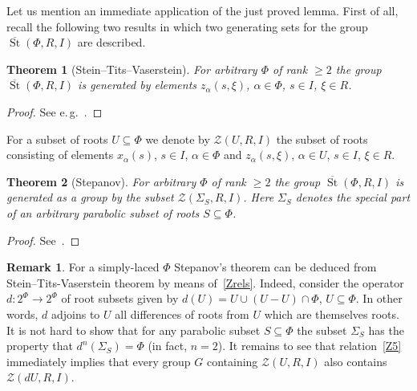 \documentclass[oneside, 8pt]{amsart}
\newtheorem*{theorem*}{Theorem}
\theoremstyle{remark}
\theoremstyle{definition}
\numberwithin{lemma}{section}
\numberwithin{prop}{section}
\numberwithin{corollary}{section}
\newtheorem{rem}[lemma]{Remark}
\DeclareMathOperator{\St}{St}
\numberwithin{equation}{section}
\begin{document}
Let us mention an immediate application of the just proved lemma. 
First of all, recall the following two results in which two generating sets for the group $\overline{\St}(\Phi, R, I)$ are described.
\begin{theorem*}[Stein--Tits--Vaserstein]
 For arbitrary $\Phi$ of rank $\geq 2$ the group $\overline{\St}(\Phi, R, I)$ is generated by elements $z_\alpha(s, \xi)$, $\alpha \in \Phi$, $s \in I$, $\xi \in R$.
\end{theorem*} \begin{proof} See e.\,g.~\cite[Theorem 2]{Va86}. \end{proof}

For a subset of roots $U \subseteq \Phi$ we denote by $\mathcal{Z}(U, R, I)$ the subset of roots consisting of elements $x_\alpha(s)$, $s \in I$, $\alpha \in \Phi$ and $z_\alpha(s, \xi)$, $\alpha \in U$, $s\in I$, $\xi \in R$.

\begin{theorem*}[Stepanov] For arbitrary $\Phi$ of rank $\geq 2$ the group $\overline{\St}(\Phi, R, I)$ is generated as a group by the subset $\mathcal{Z}(\Sigma_S, R, I)$.
 Here $\Sigma_S$ denotes the special part of an arbitrary parabolic subset of roots $S \subseteq \Phi$.
\end{theorem*} \begin{proof} See~\cite[Lemma~4]{S15}. \end{proof}

\begin{rem} For a simply-laced $\Phi$ Stepanov's theorem can be deduced from Stein--Tits-Vaserstein theorem by means of~\cref{Zrels}. Indeed, consider the operator $d \colon 2^\Phi \to 2^\Phi$ of root subsets given by $d(U) = U \cup (U - U)\cap \Phi$, $U \subseteq \Phi$. In other words, $d$ adjoins to $U$ all differences of roots from $U$ which are themselves roots. It is not hard to show that for any parabolic subset $S \subseteq \Phi$ the subset $\Sigma_S$ has the property that $d^n(\Sigma_S) = \Phi$ (in fact, $n=2$). It remains to see that relation~\eqref{Z5} immediately implies that every group $G$ containing $\mathcal{Z}(U, R, I)$ also contains $\mathcal{Z}(dU, R, I)$. \end{rem}
\end{document}
